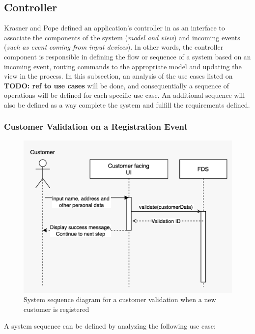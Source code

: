 \subsection{Controller}

Krasner and Pope defined an application's controller in \autocite{krasner-pope-88} as an interface to associate the components of the system (\emph{model and view}) and incoming events (\emph{such as event coming from input devices}). In other words, the controller component is responsible in defining the flow or sequence of a system based on an incoming event, routing commands to the appropriate model and updating the view in the process.
In this subsection, an analysis of the use cases listed on \textbf{TODO: ref to use cases} will be done, and consequentially a sequence of operations will be defined for each specific use case. An additional sequence will also be defined as a way complete the system and fulfill the requirements defined.  


\subsubsection{Customer Validation on a Registration Event}
 \label{subsection:regis}

\begin{figure}[!ht]
 \includegraphics[width=\textwidth]{diagrams/sequence_registration.jpeg}
 \caption{System sequence diagram for a customer validation when a new customer is registered}
\end{figure}

A system sequence can be defined by analyzing the following use case:

